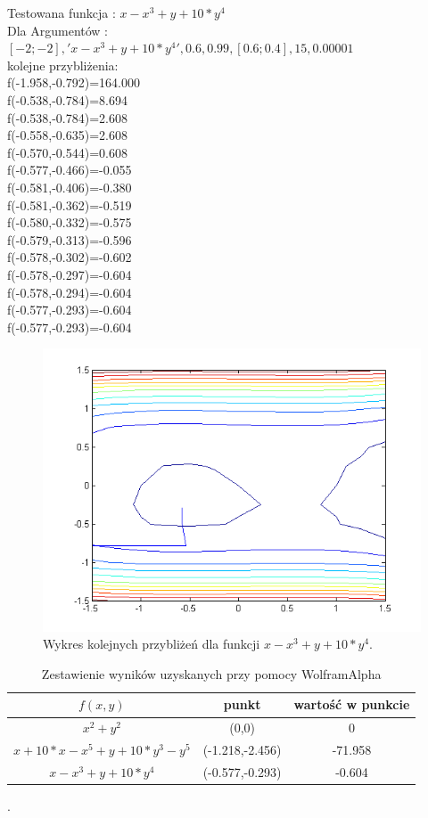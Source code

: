 \documentclass{classrep}
\begin{document}
Testowana funkcja : $x - x^{3} +y+10*y^{4}$\\
Dla Argumentów : $[-2;-2],'x - x^{3}+y+10*y^{4}',0.6,0.99,[0.6;0.4],15,0.00001$\\
kolejne przybliżenia:\\
f(-1.958,-0.792)=164.000\\
f(-0.538,-0.784)=8.694\\
f(-0.538,-0.784)=2.608\\
f(-0.558,-0.635)=2.608\\
f(-0.570,-0.544)=0.608\\
f(-0.577,-0.466)=-0.055\\
f(-0.581,-0.406)=-0.380\\
f(-0.581,-0.362)=-0.519\\
f(-0.580,-0.332)=-0.575\\
f(-0.579,-0.313)=-0.596\\
f(-0.578,-0.302)=-0.602\\
f(-0.578,-0.297)=-0.604\\
f(-0.578,-0.294)=-0.604\\
f(-0.577,-0.293)=-0.604\\
f(-0.577,-0.293)=-0.604\\


\begin{figure}[H]
\centering
\includegraphics[width=12cm]{fcja3} 
\caption{Wykres kolejnych przybliżeń dla funkcji $x - x^3 +y+10*y^4$.}
\label{fig:funkcja32}
\end{figure}


\begin{table}[H]
	\begin{center}
	\begin{tabular}{|c|c|c|}
	\hline $f(x,y)$ & punkt & wartość w punkcie \\ 
	\hline $x^2+y^2$ & (0,0) & 0 \\ 
	\hline $x + 10*x - x^5 + y + 10*y^3 - y^5$ & (-1.218,-2.456) & -71.958 \\ 
	\hline $x - x^3 +y+10*y^4$ & (-0.577,-0.293) & -0.604 \\ 
	\hline 
	\end{tabular}
	\caption{Zestawienie wyników uzyskanych przy pomocy WolframAlpha }.
	\label{wolfram}
	\end{center}
\end{table}
\end{document}
